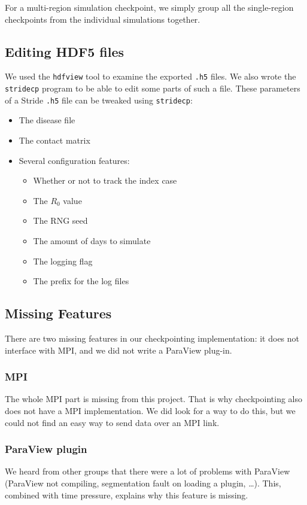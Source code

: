 \documentclass[a4paper,12pt]{article}
\begin{document}
For a multi-region simulation checkpoint, we simply group all the single-region checkpoints from the individual simulations together.

\subsection{Editing HDF5 files}
We used the \texttt{hdfview} tool to examine the exported \texttt{.h5} files. We also wrote the \texttt{stridecp} program to be able to edit some parts of such a file. These parameters of a Stride \texttt{.h5} file can be tweaked using \texttt{stridecp}:
\begin{itemize}
	\item The disease file
	\item The contact matrix
	\item Several configuration features:
	\begin{itemize}
		\item Whether or not to track the index case
		\item The $R_0$ value
		\item The RNG seed
		\item The amount of days to simulate
		\item The logging flag
		\item The prefix for the log files
	\end{itemize}
\end{itemize}
\subsection{Missing Features}
There are two missing features in our checkpointing implementation: it does not interface with MPI, and we did not write a ParaView plug-in.

\subsubsection{MPI}
The whole MPI part is missing from this project. That is why checkpointing also does not have a MPI implementation. We did look for a way to do this, but we could not find an easy way to send data over an MPI link.

\subsubsection{ParaView plugin}
We heard from other groups that there were a lot of problems with ParaView (ParaView not compiling, segmentation fault on loading a plugin, \dots). This, combined with time pressure, explains why this feature is missing.
\end{document}
